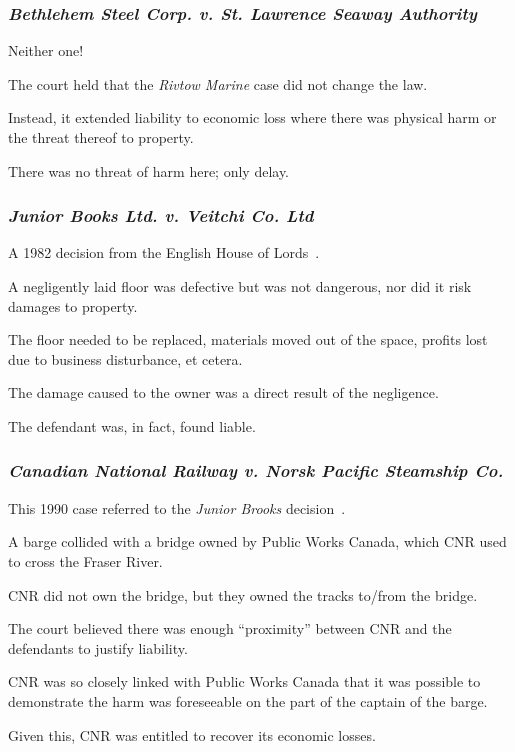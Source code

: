\begin{frame}
\frametitle{\textit{Bethlehem Steel Corp. v. St. Lawrence Seaway Authority}}

Neither one!

The court held that the \textit{Rivtow Marine} case did not change the law.

Instead, it extended liability to economic loss where there was physical harm or the threat thereof to property.

There was no threat of harm here; only delay.

\end{frame}



\begin{frame}
\frametitle{\textit{Junior Books Ltd. v. Veitchi Co. Ltd}}

A 1982 decision from the English House of Lords~\cite{lpe}. 

A negligently laid floor was defective but was not dangerous, nor did it risk damages to property.

The floor needed to be replaced, materials moved out of the space, profits lost due to business disturbance, et cetera.

The damage caused to the owner was a direct result of the negligence.

The defendant was, in fact, found liable.


\end{frame}



\begin{frame}
\frametitle{\textit{Canadian National Railway v. Norsk Pacific Steamship Co.}}

This 1990 case referred to the \textit{Junior Brooks} decision~\cite{lpe}.

A barge collided with a bridge owned by Public Works Canada, which CNR used to cross the Fraser River.

CNR did not own the bridge, but they owned the tracks to/from the bridge. 

The court believed there was enough ``proximity'' between CNR and the defendants to justify liability.

CNR was so closely linked with Public Works Canada that it was possible to demonstrate the harm was foreseeable on the part of the captain of the barge.

Given this, CNR was entitled to recover its economic losses.


\end{frame}


